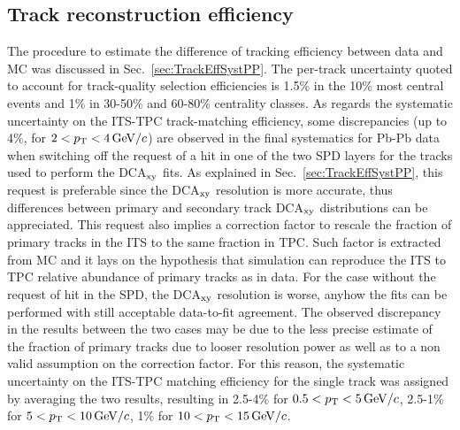\subsection{Track reconstruction efficiency}
\label{sec:TrackEffSystPbPb}
The procedure to estimate the difference
of tracking efficiency between data and MC was discussed in Sec.~\ref{sec:TrackEffSystPP}.
The per-track uncertainty quoted to account for track-quality selection efficiencies
is 1.5\% in the 10\% most central events and 1\% in 30-50\% and 60-80\% 
centrality classes. As regards the systematic uncertainty on the ITS-TPC 
track-matching efficiency, some discrepancies (up to 4\%, for $2 < p_{\rm T} < 4\, \mathrm{GeV}/c$) 
are observed in the final systematics for Pb-Pb data
when switching off the request of a hit in one of the two SPD 
layers for the tracks used to perform the DCA$_{\rm xy}$ fits.
As explained in Sec.~\ref{sec:TrackEffSystPP}, this request is 
preferable since the DCA$_{\rm xy}$
resolution is more accurate, thus differences between primary and secondary track DCA$_{\rm xy}$ 
distributions can be appreciated. This request also implies 
a correction factor to rescale the fraction of primary tracks in the ITS
to the same fraction in TPC. Such factor is extracted from MC and it
lays on the hypothesis that simulation can reproduce the ITS to TPC 
relative abundance of primary tracks 
as in data. For the case 
without the request of hit in the SPD, the DCA$_{\rm xy}$
resolution is worse, anyhow the fits can be performed with still acceptable data-to-fit agreement.
The observed discrepancy in the results between the two cases 
may be due to the less precise estimate
of the fraction of primary tracks due to looser resolution power as well as
to a non valid assumption on the correction factor. For this reason, the systematic 
uncertainty on the ITS-TPC matching efficiency for the single track was
assigned by averaging the two results, resulting in
2.5-4\% for $0.5 < p_{\rm T} < 5 \, \mathrm{GeV}/c$, 2.5-1\% for $5 < p_{\rm T} < 10 \, \mathrm{GeV}/c$, 1\% for $10 < p_{\rm T} < 15\, \mathrm{GeV}/c$.\\


